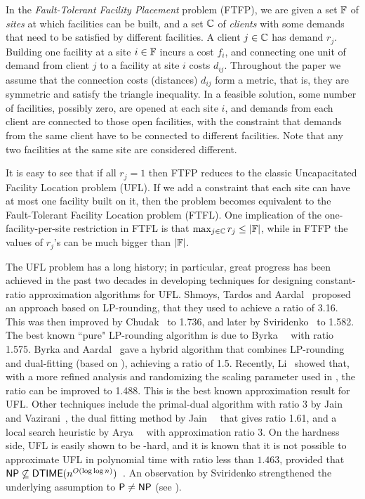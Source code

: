 \documentclass[11pt]{article}
\begin{document}
In the \emph{Fault-Tolerant Facility Placement} problem
(FTFP), we are given a set $\mathbb{F}$ of \emph{sites} at
which facilities can be built, and a set $\mathbb{C}$ of
\emph{clients} with some demands that need to be satisfied
by different facilities. A client $j\in\mathbb{C}$ has demand
$r_j$. Building one facility at a site $i\in\mathbb{F}$ incurs a cost
$f_i$, and connecting one unit of demand from client $j$ to
a facility at site $i$ costs $d_{ij}$. Throughout the
paper we assume that the connection costs (distances)
$d_{ij}$ form a metric, that is, they are
symmetric and satisfy the triangle inequality. In a feasible solution, some
number of facilities, possibly zero, are opened at each site
$i$, and demands from each client are connected to those
open facilities, with the constraint that demands from the
same client have to be connected to different
facilities. Note that any two facilities at the same site are considered different.

It is easy to see that if all $r_j=1$ then FTFP reduces to
the classic Uncapacitated Facility Location problem (UFL).
If we add a constraint that each site can have at most one
facility built on it, then the problem becomes equivalent to the
Fault-Tolerant Facility Location problem (FTFL). One
implication of the one-facility-per-site restriction in FTFL
is that $\max_{j\in\mathbb{C}}r_j \leq |\mathbb{F}|$, while
in FTFP the values of $r_j$'s can be much bigger than
$|\mathbb{F}|$.

The UFL problem has a long history; in particular, great
progress has been achieved in the past two decades in
developing techniques for designing constant-ratio
approximation algorithms for UFL.  Shmoys, Tardos and
Aardal~\cite{ShmoysTA97} proposed an approach based on
LP-rounding, that they used to achieve a ratio of 3.16.
This was then improved by Chudak~\cite{ChudakS04} to 1.736,
and later by Sviridenko~\cite{Svi02} to 1.582.
The best known ``pure" LP-rounding algorithm is due to
Byrka~{\etal}~\cite{ByrkaGS10} with ratio 1.575. 
Byrka and Aardal~\cite{ByrkaA10} gave a hybrid algorithm that combines LP-rounding
and dual-fitting (based on \cite{JainMMSV03}), achieving a ratio of 1.5.  Recently,
Li~\cite{Li11} showed that, with a more refined analysis and
randomizing the scaling parameter used in \cite{ByrkaA10}, the ratio can be improved
to 1.488. This is the best known approximation result for UFL.  
Other techniques include the primal-dual algorithm with ratio 3 by
Jain and Vazirani~\cite{JainV01}, the dual fitting method by
Jain~{\etal}~\cite{JainMMSV03} that gives ratio 1.61, and a
local search heuristic by Arya~{\etal}~\cite{AryaGKMMP04}
with approximation ratio 3.  On the hardness side, UFL is
easily shown to be {\NP}-hard, and it is known that it is
not possible to approximate UFL in polynomial time with
ratio less than $1.463$, provided that
${\mbox{\sf NP}}\not\subseteq{\mbox{\sf DTIME}}(n^{O(\log\log
  n)})$~\cite{GuhaK98}. An observation by Sviridenko
strengthened the underlying assumption to ${\mbox{\sf P}}\ne {\mbox{\sf NP}}$ (see \cite{vygen05}).
\end{document}
